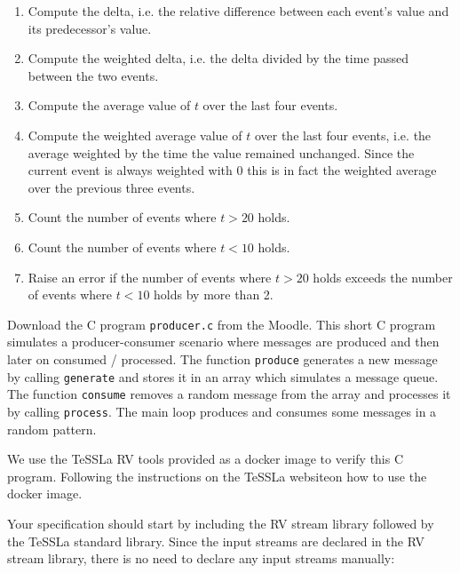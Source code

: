 \documentclass[language=en,sheet=7,prefix]{exercise}
\begin{document}
\begin{enumerate}
  \item Compute the delta, i.e. the relative difference between each event's value and its predecessor's value.
  \item Compute the weighted delta, i.e. the delta divided by the time passed between the two events.
  \item Compute the average value of $t$ over the last four events.
  \item Compute the weighted average value of $t$ over the last four events, i.e. the average weighted by the time the value remained unchanged. Since the current event is always weighted with 0 this is in fact the weighted average over the previous three events.
  \item Count the number of events where $t>20$ holds.
  \item Count the number of events where $t<10$ holds.
  \item Raise an error if the number of events where $t>20$ holds exceeds the number of events where $t<10$ holds by more than 2.
\end{enumerate}

\begin{solution}
  
\end{solution}


Download the C program \texttt{producer.c} from the Moodle. This short C program simulates a producer-consumer scenario where messages are produced and then later on consumed / processed. The function \texttt{produce} generates a new message by calling \texttt{generate} and stores it in an array which simulates a message queue. The function \texttt{consume} removes a random message from the array and processes it by calling \texttt{process}. The main loop produces and consumes some messages in a random pattern.

We use the TeSSLa RV tools provided as a docker image to verify this C program. Following the instructions on the TeSSLa website\footnotemark[1] on how to use the docker image.

Your specification should start by including the RV stream library followed by the TeSSLa standard library. Since the input streams are declared in the RV stream library, there is no need to declare any input streams manually:


\end{document}
